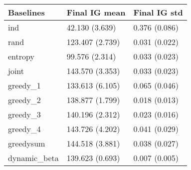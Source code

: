 \begin{tabular}{lll}
\toprule
    Baselines &    Final IG mean &   Final IG std \\
\midrule
          ind &   42.130 (3.639) &  0.376 (0.086) \\
         rand &  123.407 (2.739) &  0.031 (0.022) \\
      entropy &   99.576 (2.314) &  0.033 (0.023) \\
        joint &  143.570 (3.353) &  0.033 (0.023) \\
     greedy\_1 &  133.613 (6.105) &  0.065 (0.046) \\
     greedy\_2 &  138.877 (1.799) &  0.018 (0.013) \\
     greedy\_3 &  140.196 (2.312) &  0.023 (0.016) \\
     greedy\_4 &  143.726 (4.202) &  0.041 (0.029) \\
    greedysum &  144.518 (3.881) &  0.038 (0.027) \\
 dynamic\_beta &  139.623 (0.693) &  0.007 (0.005) \\
\bottomrule
\end{tabular}
